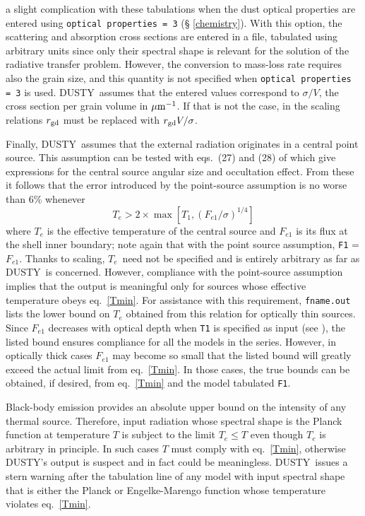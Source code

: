 \documentclass[11pt]{article}
\def\D    {{\sf DUSTY}}
\def\eq#1{\begin{equation} #1 \end{equation}}
\def\mic    {\hbox{$\mu$m}}
\def\Te   {\hbox{$T_e$}}
\begin{document}
a slight complication with these tabulations when the dust optical
properties are entered using {\tt optical properties = 3} (\S
\ref{chemistry}). With this option, the scattering and absorption
cross sections are entered in a file, tabulated using arbitrary units
since only their spectral shape is relevant for the solution of the
radiative transfer problem. However, the conversion to mass-loss rate
requires also the grain size, and this quantity is not specified when
{\tt optical properties = 3} is used.  \D\ assumes that the entered
values correspond to $\sigma/V$, the cross section per grain volume in
$\mic^{-1}$.  If that is not the case, in the scaling relations
$r_{\rm gd}$ must be replaced with $r_{\rm gd}V/\sigma$.

Finally, \D\ assumes that the external radiation originates in a
central point source. This assumption can be tested with eqs.\ (27)
and (28) of \cite{IE97} which give expressions for the central source
angular size and occultation effect. From these it follows that the
error introduced by the point-source assumption is no worse than 6\%
whenever \eq{\label{Tmin} T_e > 2\times\max[T_1,
  (F_{e1}/\sigma)^{1/4}]} where $T_e$ is the effective temperature of
the central source and $F_{e1}$ is its flux at the shell inner
boundary; note again that with the point source assumption, {\tt F1} =
$F_{e1}$. Thanks to scaling, \Te\ need not be specified and is
entirely arbitrary as far as \D\ is concerned. However, compliance
with the point-source assumption implies that the output is meaningful
only for sources whose effective temperature obeys eq.\
\ref{Tmin}. For assistance with this requirement, {\tt fname.out}
lists the lower bound on $T_e$ obtained from this relation for
optically thin sources. Since $F_{e1}$ decreases with optical depth
when {\tt T1} is specified as input (see \cite{IE97}), the listed
bound ensures compliance for all the models in the series. However, in
optically thick cases $F_{e1}$ may become so small that the listed
bound will greatly exceed the actual limit from eq.\ \ref{Tmin}. In
those cases, the true bounds can be obtained, if desired, from eq.\
\ref{Tmin} and the model tabulated {\tt F1}.

Black-body emission provides an absolute upper bound on the intensity
of any thermal source. Therefore, input radiation whose spectral shape
is the Planck function at temperature $T$ is subject to the limit $T_e
\le T$ even though $T_e$ is arbitrary in principle. In such cases $T$
must comply with eq.\ \ref{Tmin}, otherwise \D's output is suspect and
in fact could be meaningless.  \D\ issues a stern warning after the
tabulation line of any model with input spectral shape that is either
the Planck or Engelke-Marengo function whose temperature violates eq.\
\ref{Tmin}.
\end{document}
